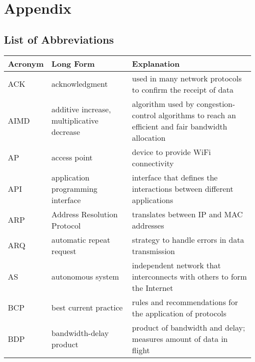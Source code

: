 
\section{Appendix}

\subsection{List of Abbreviations}
\begin{longtable}{p{1.7cm} | p{5cm} | p{8cm}}
    Acronym & Long Form                                   & Explanation                                                                                         \\\hline
    ACK     & acknowledgment                              & used in many network protocols to confirm the receipt of data                                       \\
    AIMD    & additive increase, multiplicative decrease  & algorithm used by congestion-control algorithms to reach an efficient and fair bandwidth allocation \\
    AP      & access point                                & device to provide WiFi connectivity                                                                 \\
    API     & application programming interface           & interface that defines the interactions between different applications                              \\
    ARP     & Address Resolution Protocol                 & translates between IP and MAC addresses                                                             \\
    ARQ     & automatic repeat request                    & strategy to handle errors in data transmission                                                      \\
    AS      & autonomous system                           & independent network that interconnects with others to form the Internet                             \\
    BCP     & best current practice                       & rules and recommendations for the application of protocols                                          \\
    BDP     & bandwidth-delay product                     & product of bandwidth and delay; measures amount of data in flight                                   \\

\end{longtable}
